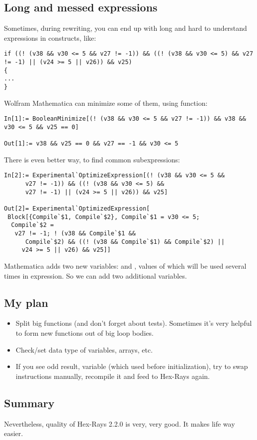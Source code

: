 \subsection{Long and messed expressions}

Sometimes, during rewriting, you can end up with long and hard to understand expressions in  constructs, like:

\begin{lstlisting}
if ((! (v38 && v30 <= 5 && v27 != -1)) && ((! (v38 && v30 <= 5) && v27 != -1) || (v24 >= 5 || v26)) && v25)
{
...
}
\end{lstlisting}

Wolfram Mathematica can minimize some of them, using  function:

\begin{lstlisting}
In[1]:= BooleanMinimize[(! (v38 && v30 <= 5 && v27 != -1)) && v38 && v30 <= 5 && v25 == 0]

Out[1]:= v38 && v25 == 0 && v27 == -1 && v30 <= 5
\end{lstlisting}

There is even better way, to find common subexpressions:

\begin{lstlisting}
In[2]:= Experimental`OptimizeExpression[(! (v38 && v30 <= 5 && 
      v27 != -1)) && ((! (v38 && v30 <= 5) && 
      v27 != -1) || (v24 >= 5 || v26)) && v25]

Out[2]= Experimental`OptimizedExpression[
 Block[{Compile`$1, Compile`$2}, Compile`$1 = v30 <= 5; 
  Compile`$2 = 
   v27 != -1; ! (v38 && Compile`$1 && 
      Compile`$2) && ((! (v38 && Compile`$1) && Compile`$2) || 
     v24 >= 5 || v26) && v25]]
\end{lstlisting}

Mathematica adds two new variables:  and , values of which will be used several times in expression.
So we can add two additional variables.

\subsection{My plan}

\begin{itemize}
\item Split big functions (and don't forget about tests).
Sometimes it's very helpful to form new functions out of big loop bodies.

\item Check/set data type of variables, arrays, etc.

\item If you see odd result,  variable (which used before initialization), try to swap instructions manually,
recompile it and feed to Hex-Rays again.
\end{itemize}

\subsection{Summary}

Nevertheless, quality of Hex-Rays 2.2.0 is very, very good.
It makes life way easier.

